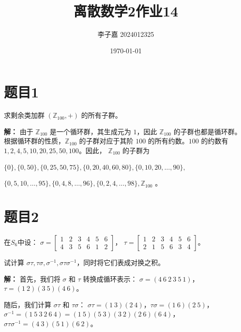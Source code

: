 \documentclass[utf8]{ctexart}
\title{\textbf{离散数学2\quad 作业14}}
\date{\today}
\author{李子嘉 2024012325}
\theoremstyle{mystyle}
\begin{document}
\maketitle

\section*{题目1}

\begin{problembox}
 求剩余类加群 $(\mathbb{Z}_{100}, +)$ 的所有子群。
\end{problembox}
\textbf{解：} 
由于 $\mathbb{Z}_{100}$ 是一个循环群，其生成元为 $1$，因此 $\mathbb{Z}_{100}$ 的子群也都是循环群。根据循环群的性质，$\mathbb{Z}_{100}$ 的子群对应于其阶 $100$ 的所有约数。$100$ 的约数有 $1, 2, 4, 5, 10, 20, 25, 50, 100$。因此，
$\mathbb{Z}_{100}$ 的子群为 

$\{0\}, \{0, 50\}, \{0, 25, 50, 75\}, \{0, 20, 40, 60, 80\}, \{0, 10, 20, \ldots, 90\}, $

$\{0, 5, 10, \ldots, 95\}, \{0, 4, 8, \ldots, 96\}, \{0, 2, 4, \ldots, 98\}, \mathbb{Z}_{100}$ 。

\section*{题目2}
\begin{problembox}
在$S_6$中设：
$\sigma = \begin{bmatrix}
1 & 2 & 3 & 4 & 5 & 6\\
4 & 3 & 5 & 6 & 1 & 2
\end{bmatrix}$，
$\tau = \begin{bmatrix}1 & 2 & 3 & 4 & 5 & 6\\
2 & 1 & 5 & 6 & 3 & 4
\end{bmatrix}$。

试计算 $\sigma\tau, \tau\sigma, \sigma^{-1}, \sigma\tau\sigma^{-1}$，同时将它们表成对换之积。
\end{problembox}
\textbf{解：}
首先，我们将 $\sigma$ 和 $\tau$ 转换成循环表示：
$\sigma = (4\ 6\ 2\ 3\ 5\ 1)$，$\tau = (1\ 2)(3\ 5)(4\ 6)$。

随后，我们计算 $\sigma\tau$ 和 $\tau\sigma$：
$\sigma\tau = (1\ 3)(2\ 4)$，$\tau\sigma = (1\ 6)(2\ 5)$，$\sigma^{-1} = (1\ 5\ 3\ 2\ 6\ 4) = (1\ 5)(5\ 3)(3\ 2)(2\ 6)(6\ 4)$，$\sigma\tau\sigma^{-1} = (4\ 3)(5\ 1)(6\ 2)$。
\end{document}
